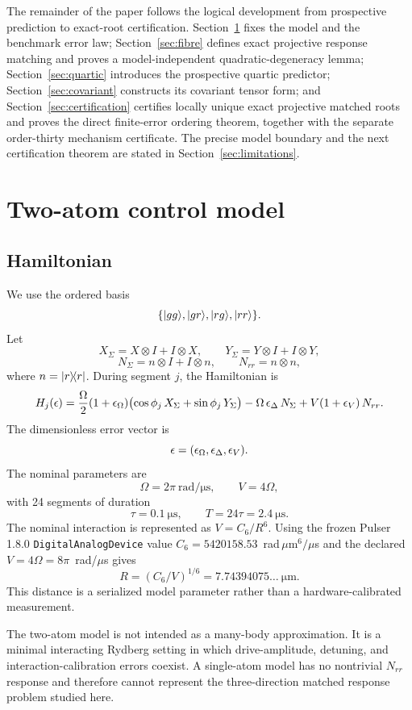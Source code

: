 The remainder of the paper follows the logical development from prospective prediction to
exact-root certification. Section~\ref{sec:model} fixes the model and the benchmark error
law; Section~\ref{sec:fibre} defines exact projective response matching and proves a
model-independent quadratic-degeneracy lemma; Section~\ref{sec:quartic} introduces the
prospective quartic predictor; Section~\ref{sec:covariant} constructs its covariant tensor
form; and Section~\ref{sec:certification} certifies locally unique exact projective matched
roots and proves the direct finite-error ordering theorem, together with the separate
order-thirty mechanism certificate. The precise model boundary and the next certification
theorem are stated in Section~\ref{sec:limitations}.

\section{Two-atom control model}\label{sec:model}

\subsection{Hamiltonian}

We use the ordered basis
\[
\{\lvert gg \rangle,\lvert gr \rangle,\lvert rg \rangle,\lvert rr \rangle\}.
\]
Let
\[
X_{\Sigma}=X\otimes I+I\otimes X,\qquad
Y_{\Sigma}=Y\otimes I+I\otimes Y,
\]
\[
N_{\Sigma}=n\otimes I+I\otimes n,\qquad N_{rr}=n\otimes n,
\]
where $n=\lvert r \rangle\!\langle r \rvert$. During segment $j$, the Hamiltonian is
\begin{equation}\label{eq:hamiltonian}
H_{j}(\epsilon)=\frac{\Omega}{2}(1+\epsilon_{\Omega})
\bigl(\cos\phi_{j}\,X_{\Sigma}+\sin\phi_{j}\,Y_{\Sigma}\bigr)
-\Omega\,\epsilon_{\Delta}\,N_{\Sigma}+V(1+\epsilon_{V})\,N_{rr}.
\end{equation}
The dimensionless error vector is
\[
\epsilon=(\epsilon_{\Omega},\epsilon_{\Delta},\epsilon_{V}).
\]
The nominal parameters are
\[
\Omega=2\pi\ \mathrm{rad/\mu s},\qquad V=4\Omega,
\]
with 24 segments of duration
\[
\tau=0.1\ \mathrm{\mu s},\qquad T=24\tau=2.4\ \mathrm{\mu s}.
\]
The nominal interaction is represented as $V=C_{6}/R^{6}$. Using the frozen Pulser 1.8.0
\texttt{DigitalAnalogDevice} value $C_{6}=5420158.53$~rad\,$\mu\mathrm{m}^{6}/\mu$s and the
declared $V=4\Omega=8\pi$~rad/$\mu$s gives
\[
R=(C_{6}/V)^{1/6}=7.74394075\ldots\ \mathrm{\mu m}.
\]
This distance is a serialized model parameter rather than a hardware-calibrated
measurement.

The two-atom model is not intended as a many-body approximation. It is a minimal
interacting Rydberg setting in which drive-amplitude, detuning, and interaction-calibration
errors coexist. A single-atom model has no nontrivial $N_{rr}$ response and therefore
cannot represent the three-direction matched response problem studied here.

